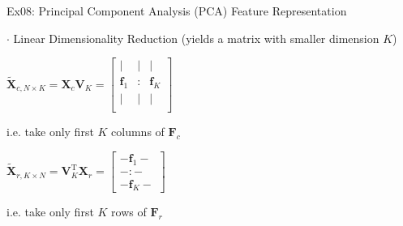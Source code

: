 \documentclass[mathserif, aspectratio=1610]{intbeamer}
\begin{document}
\begin{frame}[t]{Ex08: Principal Component Analysis (PCA) Feature Representation}
\begin{minipage}[t]{0.49\textwidth}
\end{minipage}

\vspace{1em}

$\cdot$ Linear Dimensionality Reduction (yields a matrix with smaller dimension $K$)

\begin{minipage}[t]{0.49\textwidth}
$\tilde{\bm{X}}_{c,N \times K} = \bm{X}_c \bm{V}_K =
\begin{bmatrix}
| & | & |\\
\bm{f}_1 & : & \bm{f}_{K}\\
| & | & |\\
\end{bmatrix}
$

i.e. take only first $K$ columns of $\bm{F}_c$
\end{minipage}
%
\begin{minipage}[t]{0.49\textwidth}
$\tilde{\bm{X}}_{r,K \times N} = \bm{V}_K^\mathrm{T} \bm{X}_r
=
\begin{bmatrix}
- \bm{f}_1 -\\
- : -\\
- \bm{f}_K -
\end{bmatrix}
$

i.e. take only first $K$ rows of $\bm{F}_r$
\end{minipage}

\end{frame}
\end{document}

